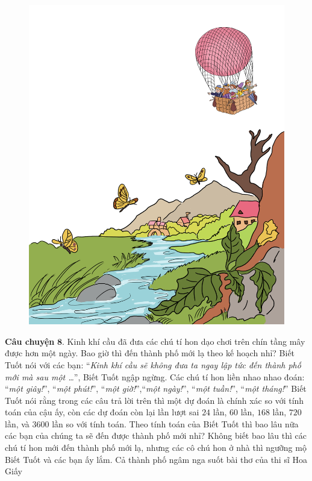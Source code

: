	\begin{figure}[H]
		\centering
		\vspace*{-5pt}
		\captionsetup{labelformat= empty, justification=centering}
		\includegraphics[width=0.5\linewidth]{Hinh23_KinhKhiCau}
		\vspace*{-10pt}
	\end{figure}
		
	\vskip 0.1cm
	\textbf{\color{toancuabi}Câu chuyện} $\pmb{8.}$ Kinh khí cầu đã đưa các chú tí hon dạo chơi trên chín tầng mây được hơn một ngày. Bao giờ thì đến thành phố mới lạ theo kế hoạch nhỉ? Biết Tuốt nói với các bạn:
	\vskip 0.1cm
	“\textit{Kinh khí cầu sẽ không đưa ta ngay lập tức đến thành phố mới mà sau một …}”, Biết Tuốt ngập ngừng. Các chú tí hon liền nhao nhao đoán: “\textit{một giây!}”, “\textit{một phút!}”, “\textit{một giờ!}”,“\textit{một ngày!}”, “\textit{một tuần!}”, “\textit{một tháng!}” Biết Tuốt nói rằng trong các câu trả lời trên thì một dự đoán là chính xác so với tính toán của cậu ấy, còn các dự đoán còn lại lần lượt sai $24$ lần, $60$ lần, $168$ lần, $720$ lần, và $3600$ lần so với tính toán. Theo tính toán của Biết Tuốt thì bao lâu nữa các bạn của chúng ta sẽ đến được thành phố mới nhỉ?
	\vskip 0.1cm
	Không biết bao lâu thì các chú tí hon mới đến thành phố mới lạ, nhưng các cô chú hon ở nhà thì ngưỡng mộ Biết Tuốt và các bạn ấy lắm. Cả thành phố ngâm nga suốt bài thơ của thi sĩ Hoa Giấy
	
